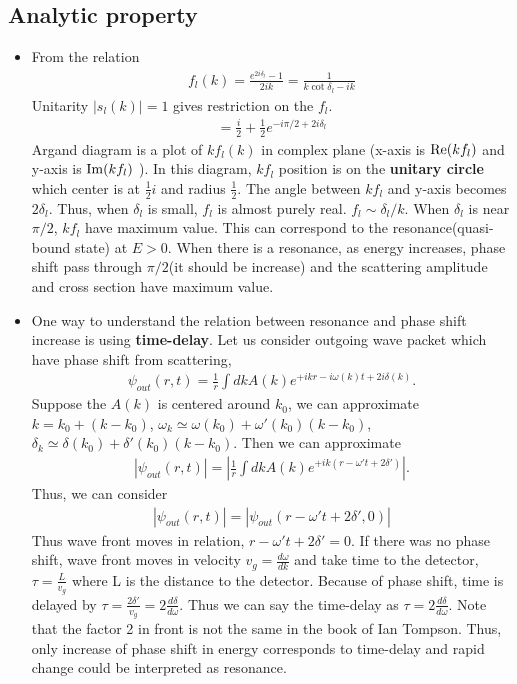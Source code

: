 \documentclass[10pt]{article}
\newcommand{\bea}{\begin{eqnarray}}
\newcommand{\eea}{\end{eqnarray}}
\begin{document}
\subsection{Analytic property}
\begin{itemize}
\item 
From the relation 
\bea 
f_l(k)=\frac{e^{2i\delta_l}-1}{2ik}=\frac{1}{k\cot\delta_l-ik}
\eea 
Unitarity $|s_l(k)|=1$ gives restriction on the $f_l$.
\bea
[k f_l]=\frac{i}{2}+\frac{1}{2}e^{-i\pi/2+2i\delta_l}
\eea 
Argand diagram is a plot of $k f_l(k)$ in complex plane
(x-axis is ${\rm Re}(k f_l)$ and y-axis is ${\rm Im}(k f_l)$ ).
In this diagram, $k f_l$ position is on the {\bf unitary circle} which center is
at $\frac{1}{2} i$ and radius $\frac{1}{2}$. The angle between
$k f_l$ and y-axis becomes $2\delta_l$. 
Thus, when $\delta_l$ is small, $f_l$ is almost purely real. $f_l\sim \delta_l/k$.
When $\delta_l$ is near $\pi/2$, $kf_l$ have maximum value. 
This can correspond to the resonance(quasi-bound state) at $E>0$. 
When there is a resonance, as energy increases, 
phase shift pass through $\pi/2$(it should be increase) and 
the scattering amplitude and cross section have maximum value. 

\item One way to understand the relation between resonance and phase shift increase is using 
      {\bf time-delay}.
      Let us consider outgoing wave packet which have phase shift from scattering,
      \bea 
      \psi_{out}(r,t)=\frac{1}{r}\int dk A(k) e^{+i k r -i\omega(k)t+2i\delta(k)}.
      \eea 
      Suppose the $A(k)$ is centered around $k_0$, we can approximate
      $k=k_0+(k-k_0)$,
      $\omega_k\simeq \omega(k_0)+\omega'(k_0)(k-k_0)$,
      $\delta_k\simeq \delta(k_0)+\delta'(k_0)(k-k_0)$.
      Then we can approximate
      \bea 
      |\psi_{out}(r,t)|=|\frac{1}{r}\int dk A(k) e^{+i k(r-\omega' t+2\delta') }|.
      \eea 
     Thus, we can consider
     \bea  
     |\psi_{out}(r,t)|=|\psi_{out}(r-\omega't+2\delta',0)|
     \eea  
     Thus wave front moves in relation, $r-\omega't+2\delta'=0$. If there was no phase shift,
     wave front moves in velocity $v_g=\frac{d\omega}{dk}$ and take time to the detector,
     $\tau=\frac{L}{v_g}$ where L is the distance to the detector. 
     Because of phase shift, time is delayed by $\tau=\frac{2\delta'}{v_g}=2\frac{d\delta}{d \omega} $.
     Thus we can say the time-delay as $\tau=2\frac{d\delta}{d \omega} $.
     Note that the factor 2 in front is not the same in the book of Ian Tompson. 
     Thus, only increase of phase shift in energy corresponds to time-delay
     and rapid change could be interpreted as resonance. 
     

\end{itemize}
\end{document}
